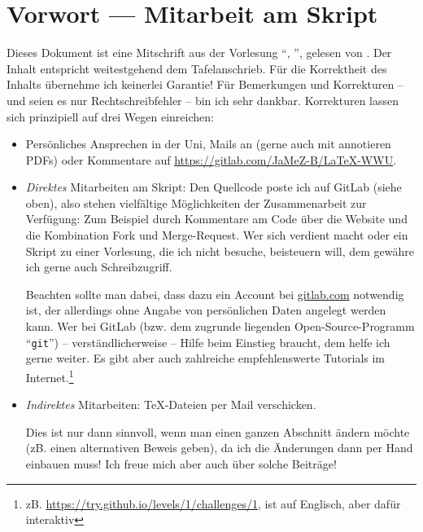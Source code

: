 \section*{Vorwort --- Mitarbeit am Skript}
Dieses Dokument ist eine Mitschrift aus der Vorlesung \enquote{\fach, \semester}, gelesen von \prof. 
Der Inhalt entspricht weitestgehend dem Tafelanschrieb. 
Für die Korrektheit des Inhalts übernehme ich keinerlei Garantie! 
Für Bemerkungen und Korrekturen -- und seien es nur Rechtschreibfehler -- bin ich sehr dankbar. 
Korrekturen lassen sich prinzipiell auf drei Wegen einreichen: 
\begin{itemize}
	\item Persönliches Ansprechen in der Uni, Mails an  (gerne auch mit annotieren PDFs) oder Kommentare auf \url{https://gitlab.com/JaMeZ-B/LaTeX-WWU}.
	\item \emph{Direktes} Mitarbeiten am Skript: Den Quellcode poste ich auf GitLab (siehe oben), also stehen vielfältige Möglichkeiten der Zusammenarbeit zur Verfügung:
	Zum Beispiel durch Kommentare am Code über die Website und die Kombination Fork und Merge-Request. 
	Wer sich verdient macht oder ein Skript zu einer Vorlesung, die ich nicht besuche, beisteuern will, dem gewähre ich gerne auch Schreibzugriff.
	
	Beachten sollte man dabei, dass dazu ein Account bei \url{gitlab.com} notwendig ist, der allerdings ohne Angabe von persönlichen Daten angelegt werden kann. 
	Wer bei GitLab (bzw. dem zugrunde liegenden Open-Source-Programm \enquote{\texttt{git}}) -- verständlicherweise -- Hilfe beim Einstieg braucht, dem helfe ich gerne weiter. 
	Es gibt aber auch zahlreiche empfehlenswerte Tutorials im Internet.\footnote{zB. \url{https://try.github.io/levels/1/challenges/1}, ist auf Englisch, aber dafür interaktiv}
	\item \emph{Indirektes} Mitarbeiten: \TeX-Dateien per Mail verschicken. 
	
	Dies ist nur dann sinnvoll, wenn man einen ganzen Abschnitt ändern möchte (zB. einen alternativen Beweis geben), da ich die Änderungen dann per Hand einbauen muss! Ich freue mich aber auch über solche Beiträge!
\end{itemize}